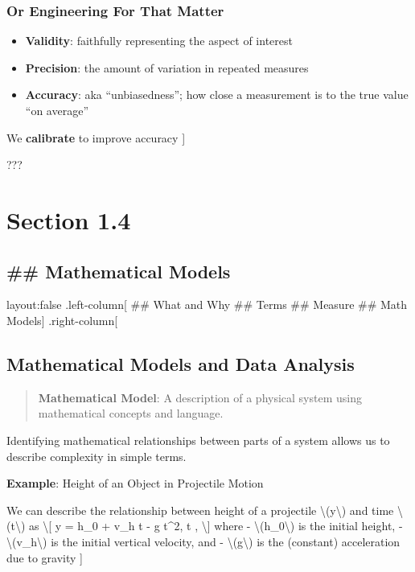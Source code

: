 \documentclass[]{article}
\providecommand{\tightlist}{%
  \setlength{\itemsep}{0pt}\setlength{\parskip}{0pt}}
\begin{document}
\subsubsection{Or Engineering For That
Matter}\label{or-engineering-for-that-matter}

\begin{itemize}
\tightlist
\item
  \textbf{Validity}: faithfully representing the aspect of interest
\item
  \textbf{Precision}: the amount of variation in repeated measures
\item
  \textbf{Accuracy}: aka ``unbiasedness''; how close a measurement is to
  the true value ``on average''
\end{itemize}

We \textbf{calibrate} to improve accuracy {]}

???

\section{Section 1.4}\label{section-1.4}

\subsection{\#\# Mathematical Models}\label{mathematical-models}

layout:false .left-column{[} \#\# What and Why \#\# Terms \#\# Measure
\#\# Math Models{]} .right-column{[}

\subsection{Mathematical Models and Data
Analysis}\label{mathematical-models-and-data-analysis}

\begin{quote}
\textbf{Mathematical Model}: A description of a physical system using
mathematical concepts and language.
\end{quote}

Identifying mathematical relationships between parts of a system allows
us to describe complexity in simple terms.

\textbf{Example}: Height of an Object in Projectile Motion

We can describe the relationship between height of a projectile
\textbackslash{}(y\textbackslash{}) and time
\textbackslash{}(t\textbackslash{}) as \textbackslash{}{[} y = h\_0 +
v\_h \cdot t -  g t\^{}2, \text{ } t ,
\textbackslash{}{]} where - \textbackslash{}(h\_0\textbackslash{}) is
the initial height, - \textbackslash{}(v\_h\textbackslash{}) is the
initial vertical velocity, and - \textbackslash{}(g\textbackslash{}) is
the (constant) acceleration due to gravity {]}
\end{document}
